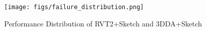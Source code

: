 \begin{figure}[h]
    \centering
    \texttt{[image: figs/failure\_distribution.png]}
    \caption{Performance Distribution of RVT2+Sketch and 3DDA+Sketch}
    \label{fig:failure_distribution}
\end{figure}